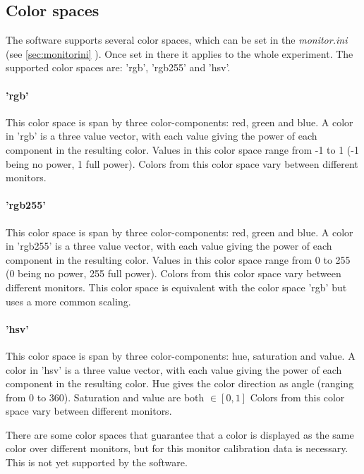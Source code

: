 \documentclass[12pt,a4paper]{book}
\begin{document}
\subsection{Color spaces}\label{sec:color_spaces}

The software supports several color spaces, which can be set in the \textit{monitor.ini} (see \ref{sec:monitorini} ). Once set in there it applies to the whole experiment. The supported color spaces are: 'rgb', 'rgb255' and 'hsv'.

\paragraph{'rgb'} This color space is span by three color-components: red, green and blue. A color in 'rgb' is a three value vector, with each value giving the power of each component in the resulting color. Values in this color space range from -1 to 1 (-1 being no power, 1 full power). Colors from this color space vary between different monitors.

\paragraph{'rgb255'} This color space is span by three color-components: red, green and blue. A color in 'rgb255' is a three value vector, with each value giving the power of each component in the resulting color. Values in this color space range from 0 to 255 (0 being no power, 255 full power). Colors from this color space vary between different monitors. This color space is equivalent with the color space 'rgb' but uses a more common scaling.

\paragraph{'hsv'} This color space is span by three color-components: hue, saturation and value. A color in 'hsv' is a three value vector, with each value giving the power of each component in the resulting color. Hue gives the color direction as angle (ranging from 0 to 360). Saturation and value are both $\in [0,1] $ Colors from this color space vary between different monitors.

\vspace{1.5em}
There are some color spaces that guarantee that a color is displayed as the same color over different monitors, but for this monitor calibration data is necessary. This is not yet supported by the software.
\end{document}
